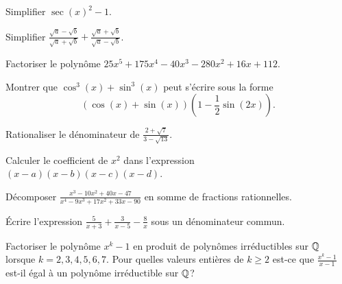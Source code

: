\begin{exercice}
Simplifier $\sec(x)^2-1$.
\end{exercice}


\begin{exercice}
Simplifier 
$\displaystyle
\frac{\sqrt{a} - \sqrt{b}}{\sqrt{a} + \sqrt{b}} + 
\frac{\sqrt{a} + \sqrt{b}}{\sqrt{a} - \sqrt{b}}$.
\end{exercice}

\begin{exercice}
Factoriser le polynôme $25 x^{5} + 175 x^{4} - 40 x^{3} - 280 x^{2} + 16 x + 112$.
\end{exercice}

\begin{exercice}
Montrer que $\cos^3(x)+\sin^3(x)$ peut s'écrire sous la forme
\[
(\cos(x)+\sin(x)) (1-\frac{1}{2}\sin(2x)).
\]
\end{exercice}

\begin{exercice}
Rationaliser le dénominateur de $\displaystyle\frac{2 + \sqrt{7}}{3 - \sqrt{13}}$.
\end{exercice}

\begin{exercice}
Calculer le coefficient de $x^2$ dans l'expression $(x-a)(x-b)(x-c)(x-d)$.
\end{exercice}

\begin{exercice}
Décomposer
$
\displaystyle
\frac{x^{3} - 10 x^{2} + 40 x - 47}{x^{4} - 9 x^{3} + 17 x^{2} + 33 x - 90}
$
en somme de fractions rationnelles.
\end{exercice}

\begin{exercice}
    Écrire l'expression
$\displaystyle\frac{5}{x + 3} + \frac{3}{x - 5} - \frac{8}{x}$
sous un dénominateur commun.
\end{exercice}

\begin{exercice}
Factoriser le polynôme $x^k-1$ en produit de polynômes irréductibles sur $\mathbb{Q}$
lorsque $k=2,3,4,5,6,7$.  Pour quelles valeurs entières de $k\geq2$ est-ce que
$\displaystyle\frac{x^k-1}{x-1}$ est-il égal à un polynôme irréductible sur
$\mathbb{Q}$?
\end{exercice}

